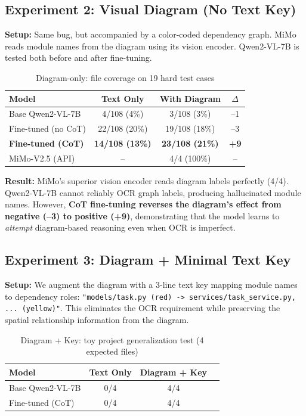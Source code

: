 \documentclass[11pt,a4paper]{article}
\begin{document}
\subsection{Experiment 2: Visual Diagram (No Text Key)}
\textbf{Setup:} Same bug, but accompanied by a color-coded dependency graph. MiMo reads module names from the diagram using its vision encoder. Qwen2-VL-7B is tested both before and after fine-tuning.
\bigskip

\begin{table}[h]
\centering
\caption{Diagram-only: file coverage on 19 hard test cases}
\begin{tabular}{lccc}
\toprule
Model & Text Only & With Diagram & $\Delta$ \\
\midrule
Base Qwen2-VL-7B  & 4/108 (4\%) & 3/108 (3\%) & --1 \\
Fine-tuned (no CoT) & 22/108 (20\%) & 19/108 (18\%) & --3 \\
\textbf{Fine-tuned (CoT)} & \textbf{14/108 (13\%)} & \textbf{23/108 (21\%)} & \textbf{+9} \\
MiMo-V2.5 (API) & -- & 4/4 (100\%) & -- \\
\bottomrule
\end{tabular}
\end{table}

\textbf{Result:} MiMo's superior vision encoder reads diagram labels perfectly (4/4). Qwen2-VL-7B cannot reliably OCR graph labels, producing hallucinated module names. However, \textbf{CoT fine-tuning reverses the diagram's effect from negative (--3) to positive (+9)}, demonstrating that the model learns to \textit{attempt} diagram-based reasoning even when OCR is imperfect.

\subsection{Experiment 3: Diagram + Minimal Text Key}
\textbf{Setup:} We augment the diagram with a 3-line text key mapping module names to dependency roles: \texttt{"models/task.py (red) -> services/task\_service.py, ... (yellow)"}. This eliminates the OCR requirement while preserving the spatial relationship information from the diagram.
\bigskip

\begin{table}[h]
\centering
\caption{Diagram + Key: toy project generalization test (4 expected files)}
\begin{tabular}{lccc}
\toprule
Model & Text Only & Diagram + Key \\
\midrule
Base Qwen2-VL-7B  & 0/4 & 4/4 \\
Fine-tuned (CoT)  & 0/4 & 4/4 \\
\bottomrule
\end{tabular}
\end{table}
\end{document}
